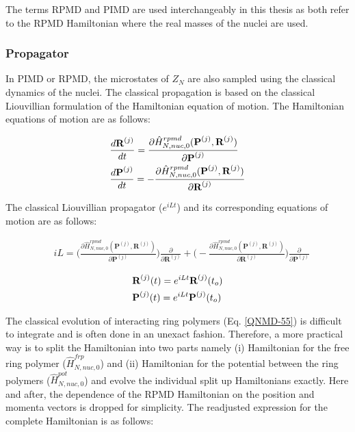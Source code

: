 \noindent The terms RPMD and PIMD are used interchangeably in this thesis as both refer to the RPMD Hamiltonian where the real masses of the nuclei are used.

\subsubsection{Propagator}

\noindent In PIMD or RPMD, the microstates of $Z_N$ are also sampled using the classical dynamics of the nuclei. The classical propagation is based on the classical Liouvillian formulation of the Hamiltonian equation of motion. The Hamiltonian equations of motion are as follows: 

\begin{align}
    \label{QNMD-4}
    &\frac{d\textbf{R}^{(j)}}{dt}=\frac{\partial\hat{H}^{rpmd}_{N,nuc,0}(\textbf{P}^{(j)},\textbf{R}^{(j)})}{\partial \textbf{P}^{(j)}}\notag\\
    &\frac{d\textbf{P}^{(j)}}{dt}=-\frac{\partial\hat{H}^{rpmd}_{N,nuc,0}(\textbf{P}^{(j)},\textbf{R}^{(j)})}{\partial \textbf{R}^{(j)}}\notag\\
\end{align}

\noindent The classical Liouvillian propagator ($e^{iLt}$) and its corresponding equations of motion are as follows:

\begin{align}
    \label{QNMD-5}
    &iL=\bigg(\frac{\partial\hat{H}^{rpmd}_{N,nuc,0}(\textbf{P}^{(j)},\textbf{R}^{(j)})}{\partial \textbf{P}^{(j)}}\bigg) \frac{\partial}{\partial \textbf{R}^{(j)}} + \bigg(-\frac{\partial\hat{H}^{rpmd}_{N,nuc,0}(\textbf{P}^{(j)},\textbf{R}^{(j)})}{\partial \textbf{R}^{(j)}}\bigg) \frac{\partial}{\partial \textbf{P}^{(j)}}
\end{align}

\begin{align}
    \label{QNMD-55}
    &\textbf{R}^{(j)}(t)=e^{iLt}\textbf{R}^{(j)}(t_o)\notag\\
    &\textbf{P}^{(j)}(t)=e^{iLt}\textbf{P}^{(j)}(t_o)
\end{align}

\noindent The classical evolution of interacting ring polymers (Eq. \ref{QNMD-55}) is difficult to integrate and is often done in an unexact fashion. Therefore, a more practical way is to split the Hamiltonian into two parts namely (i) Hamiltonian for the free ring polymer ($\hat{H}^{frp}_{N,nuc,0}$) and (ii) Hamiltonian for the potential between the ring polymers ($\hat{H}^{pot}_{N,nuc,0}$) and evolve the individual split up Hamiltonians exactly. Here and after, the dependence of the RPMD Hamiltonian on the position and momenta vectors is dropped for simplicity. The readjusted expression for the complete Hamiltonian is as follows:

